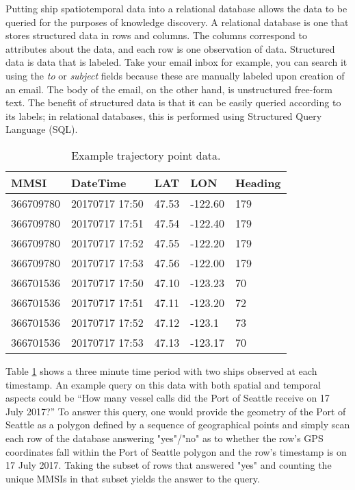 \documentclass[twoside,symmetric,notoc]{tufte-book}
\begin{document}
\par{%
Putting ship spatiotemporal data into a relational database allows the data to be queried for the purposes of knowledge discovery. A relational database is one that stores structured data in rows and columns. The columns correspond to attributes about the data, and each row is one observation of data. Structured data is data that is labeled. Take your email inbox for example, you can search it using the \textit{to} or \textit{subject} fields because these are manually labeled upon creation of an email. The body of the email, on the other hand, is unstructured free-form text. The benefit of structured data is that it can be easily queried according to its labels; in relational databases, this is performed using Structured Query Language (SQL).
}
\begin{table}
    \centering
    \begin{tabular}{l l l l l}
    \hline
     MMSI       & DateTime   & LAT   & LON         & Heading \\
     \hline
     \hline
     \rowcolor{Gray}
     366709780  & 20170717 17:50 & 47.53  & -122.60       & 179 \\
     \rowcolor{Gray}
     366709780	& 20170717 17:51 & 47.54  & -122.40      & 179 \\
     \rowcolor{Gray}
     366709780	& 20170717 17:52 & 47.55  & -122.20      & 179 \\
     \rowcolor{Gray}
     366709780	& 20170717 17:53 & 47.56  & -122.00      & 179 \\
     366701536  & 20170717 17:50 & 47.10  & -123.23      & 70  \\
     366701536	& 20170717 17:51 & 47.11  & -123.20      & 72 \\
     366701536	& 20170717 17:52 & 47.12  & -123.1       & 73  \\
     366701536	& 20170717 17:53 & 47.13  & -123.17     & 70\\
     \hline
    \end{tabular}
    \vspace{0.1in}
    \caption{Example trajectory point data.}
    \label{tab:relational}
\end{table}
\par{%
Table \ref{tab:relational} shows a three minute time period with two ships observed at each timestamp. An example query on this data with both spatial and temporal aspects could be ``How many vessel calls did the Port of Seattle receive on 17 July 2017?'' To answer this query, one would provide the geometry of the Port of Seattle as a polygon defined by a sequence of geographical points and simply scan each row of the database answering "yes"/"no" as to whether the row's GPS coordinates fall within the Port of Seattle polygon and the row's timestamp is on 17 July 2017. Taking the subset of rows that answered "yes" and counting the unique MMSIs in that subset yields the answer to the query.
}
\end{document}

